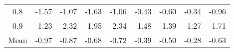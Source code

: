\begin{longtable}{ | c || c | c | c | c | c | c | c || c |}
0.8 &  \cellcolor[HTML]{FFD7D7} -1.57 &  \cellcolor[HTML]{FFE7E7} -1.07 &  \cellcolor[HTML]{FFD7D7} -1.63 &  \cellcolor[HTML]{FFE7E7} -1.06 &  \cellcolor[HTML]{FFF7F7} -0.43 &  \cellcolor[HTML]{FFEFEF} -0.60 &  \cellcolor[HTML]{FFF7F7} -0.34 &  \cellcolor[HTML]{FFE7E7} -0.96 \\
0.9 &  \cellcolor[HTML]{FFDFDF} -1.23 &  \cellcolor[HTML]{FFC7C7} -2.32 &  \cellcolor[HTML]{FFCFCF} -1.95 &  \cellcolor[HTML]{FFC7C7} -2.34 &  \cellcolor[HTML]{FFD7D7} -1.48 &  \cellcolor[HTML]{FFDFDF} -1.39 &  \cellcolor[HTML]{FFDFDF} -1.27 &  \cellcolor[HTML]{FFD7D7} -1.71 \\
\hline
\hline
Mean  &  \cellcolor[HTML]{FFE7E7} -0.97 &  \cellcolor[HTML]{FFE7E7} -0.87 &  \cellcolor[HTML]{FFEFEF} -0.68 &  \cellcolor[HTML]{FFEFEF} -0.72 &  \cellcolor[HTML]{FFF7F7} -0.39 &  \cellcolor[HTML]{FFEFEF} -0.50 &  \cellcolor[HTML]{FFF7F7} -0.28 &  \cellcolor[HTML]{FFEFEF} -0.63 \\
\hline
\end{longtable}
